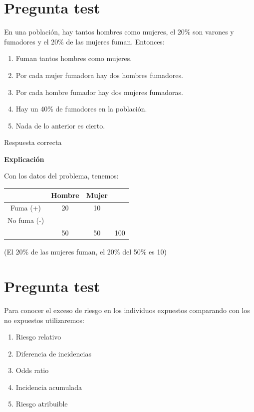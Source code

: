 \documentclass[
]{book}
\providecommand{\tightlist}{%
  \setlength{\itemsep}{0pt}\setlength{\parskip}{0pt}}
\begin{document}
\hypertarget{pregunta-test-163}{%
\section{Pregunta test}\label{pregunta-test-163}}

En una población, hay tantos hombres como mujeres, el 20\% son varones y fumadores y el 20\% de las mujeres fuman. Entonces:

\begin{enumerate}
\def\labelenumi{\alph{enumi})}
\tightlist
\item
  Fuman tantos hombres como mujeres.
\item
  Por cada mujer fumadora hay dos hombres fumadores.
\item
  Por cada hombre fumador hay dos mujeres fumadoras.
\item
  Hay un 40\% de fumadores en la población.
\item
  Nada de lo anterior es cierto.
\end{enumerate}

Respuesta correcta

\textbf{Explicación}

Con los datos del problema, tenemos:

\begin{longtable}[]{@{}cccc@{}}
\toprule
& Hombre & Mujer &\tabularnewline
\midrule
\endhead
Fuma (+) & 20 & 10 &\tabularnewline
No fuma (-) & & &\tabularnewline
& 50 & 50 & 100\tabularnewline
\bottomrule
\end{longtable}

(El 20\% de las mujeres fuman, el 20\% del 50\% es 10)

\hypertarget{pregunta-test-164}{%
\section{Pregunta test}\label{pregunta-test-164}}

Para conocer el exceso de riesgo en los individuos expuestos comparando con los no expuestos utilizaremos:

\begin{enumerate}
\def\labelenumi{\alph{enumi})}
\tightlist
\item
  Riesgo relativo
\item
  Diferencia de incidencias
\item
  Odds ratio
\item
  Incidencia acumulada
\item
  Riesgo atribuible
\end{enumerate}
\end{document}
